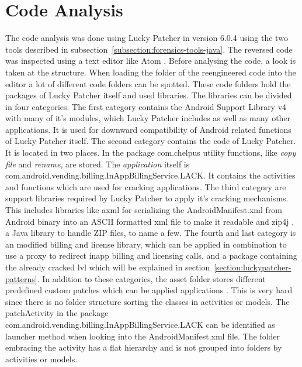 \section{Code Analysis} \label{section:luckypatcher-analysis}
The code analysis was done using Lucky Patcher in version 6.0.4 using the two tools described in subsection~\ref{subsection:forensics-tools-java}.
The reversed code was inspected using a text editor like Atom \cite{atom}.
\newline
Before analysing the code, a look is taken at the structure.
When loading the folder of the reengineered code into the editor a lot of different code folders can be spotted.
These code folders hold the packages of Lucky Patcher itself and used libraries.
The libraries can be divided in four categories.
The first category contains the Android Support Library v4 with many of it's modules, which Lucky Patcher includes as well as many other applications.
It is used for downward compatibility of Android related functions of Lucky Patcher itself.
The second category contains the code of Lucky Patcher. It is located in two places.
In the package com.chelpus utility functions, like \textit{copy file} and \textit{rename}, are stored.
The \textit{application} itself is com.android.vending.billing.InAppBillingService.LACK. It contains the activities and functions which are used for cracking applications.
The third category are support libraries required by Lucky Patcher to apply it's cracking mechanisms.
This includes libraries like axml \cite{axml} for serializing the AndroidManifest.xml from Android binary into an ASCII formatted xml file to make it readable and zip4j \cite{zip4j}, a Java library to handle ZIP files, to name a few.
The fourth and last category is an modified billing and license library, which can be applied in combination to use a proxy to redirect inapp billing and licensing calls, and a package containing the already cracked \gls{lvl} which will be explained in section~\ref{section:luckypatcher-patterns}.
In addition to these categories, the asset folder stores different predefined custom patches which can be applied applications \cite{munteanLicense}.
\newline
This is very hard since there is no folder structure sorting the classes in activities or models.
The patchActivity in the package com.android.vending.billing.InAppBillingService.LACK can be identified as launcher method when looking into the AndroidManifest.xml file.
The folder embracing the activity has a flat hierarchy and is not grouped into folders by activities or models.
